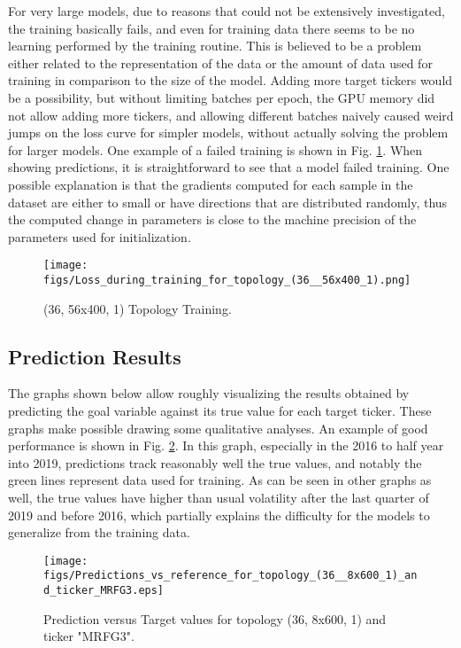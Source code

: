 \documentclass[conference]{IEEEtran}
\begin{document}
For very large models, due to reasons that could not be extensively investigated, the training basically fails, and even for training data there seems to be no learning performed by the training routine. This is believed to be a problem either related to the representation of the data or the amount of data used for training in comparison to the size of the model. Adding more target tickers would be a possibility, but without limiting batches per epoch, the GPU memory did not allow adding more tickers, and allowing different batches naively caused weird jumps on the loss curve for simpler models, without actually solving the problem for larger models. One example of a failed training is shown in Fig. \ref{fig:56x400_training}. When showing predictions, it is straightforward to see that a model failed training. One possible explanation is that the gradients computed for each sample in the dataset are either to small or have directions that are distributed randomly, thus the computed change in parameters is close to the machine precision of the parameters used for initialization.

\begin{figure}[htbp]
    \centerline{\texttt{[image: figs/Loss\_during\_training\_for\_topology\_(36\_\_56x400\_1).png]}}
    \caption{(36, 56x400, 1) Topology Training.}
    \label{fig:56x400_training}
\end{figure}

\subsection{Prediction Results}

The graphs shown below allow roughly visualizing the results obtained by predicting the goal variable against its true value for each target ticker. These graphs make possible drawing some qualitative analyses. An example of good performance is shown in Fig. \ref{fig:good_prediction}. In this graph, especially in the 2016 to half year into 2019, predictions track reasonably well the true values, and notably the green lines represent data used for training. As can be seen in other graphs as well, the true values have higher than usual volatility after the last quarter of 2019 and before 2016, which partially explains the difficulty for the models to generalize from the training data. 

\begin{figure}[htbp]
    \centerline{\texttt{[image: figs/Predictions\_vs\_reference\_for\_topology\_(36\_\_8x600\_1)\_and\_ticker\_MRFG3.eps]}}
    \caption{Prediction versus Target values for topology (36, 8x600, 1) and ticker "MRFG3".}
    \label{fig:good_prediction}
\end{figure}
\end{document}
